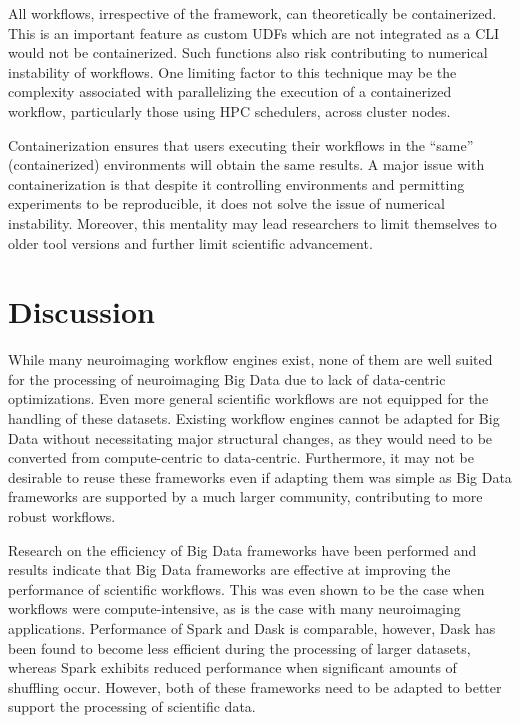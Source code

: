             All workflows, irrespective of the framework, can theoretically be
            containerized. This is an important feature as custom UDFs which are
            not integrated as a CLI would not be containerized. Such functions
            also risk contributing to numerical instability of workflows. One
            limiting factor to this technique may be the complexity associated
            with parallelizing the execution of a containerized workflow,
            particularly those using HPC schedulers, across cluster nodes.  

            Containerization ensures that users executing their workflows in the
            ``same'' (containerized) environments will obtain the same results. A
            major issue with containerization is that despite it controlling
            environments and permitting experiments to be reproducible, it does
            not solve the issue of numerical instability. Moreover, this
            mentality may lead researchers to limit themselves to older tool
            versions and further limit scientific advancement.
    
    
    \section{Discussion}
    
        While many neuroimaging workflow engines exist, none of them are well
        suited for the processing of neuroimaging Big Data due to lack of
        data-centric optimizations. Even more general scientific workflows are
        not equipped for the handling of these datasets. Existing
        workflow engines cannot be adapted for Big Data without necessitating
        major structural changes, as they would need to be converted from
        compute-centric to data-centric. Furthermore, it may not be desirable to
        reuse these frameworks even if adapting them was simple as Big Data
        frameworks are supported by a much larger community, contributing to
        more robust workflows.

        Research on the efficiency of Big Data frameworks have been performed
        and results indicate that Big Data frameworks are effective at improving
        the performance of scientific workflows. This was even shown to be the
        case when workflows were compute-intensive, as is the case with many
        neuroimaging applications. Performance of Spark and Dask is comparable,
        however, Dask has been found to become less efficient during the
        processing of larger datasets, whereas Spark exhibits reduced
        performance when significant amounts of shuffling occur. However, both
        of these frameworks need to be adapted to better support the processing
        of scientific data. 

